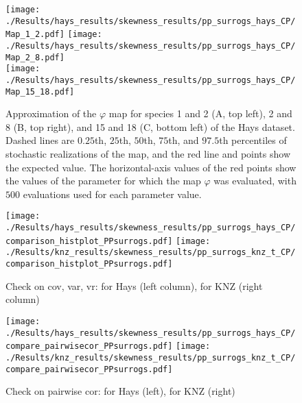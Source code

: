 \documentclass[letterpaper,11pt]{article}
\begin{document}





\begin{figure}
\texttt{[image: ./Results/hays\_results/skewness\_results/pp\_surrogs\_hays\_CP/Map\_1\_2.pdf]} 
\texttt{[image: ./Results/hays\_results/skewness\_results/pp\_surrogs\_hays\_CP/Map\_2\_8.pdf]} \\
\texttt{[image: ./Results/hays\_results/skewness\_results/pp\_surrogs\_hays\_CP/Map\_15\_18.pdf]}
\caption{Approximation of the $\varphi$ map for species 1 and 2 (A, top left), 2 and 8 (B, top right), and 15 and 18 (C, bottom left) 
of the Hays dataset. Dashed lines are $0.25$th, $25$th, $50$th, $75$th, and $97.5$th percentiles 
of stochastic realizations of the map, and
the red line and points show the expected value. The horizontal-axis values of the red 
points show the values of the
parameter for which the map $\varphi$ was evaluated, with $500$ evaluations used for
each parameter value.}\label{fig:varphiexample}
\end{figure}


\begin{figure}
\texttt{[image: ./Results/hays\_results/skewness\_results/pp\_surrogs\_hays\_CP/comparison\_histplot\_PPsurrogs.pdf]}
\texttt{[image: ./Results/knz\_results/skewness\_results/pp\_surrogs\_knz\_t\_CP/comparison\_histplot\_PPsurrogs.pdf]}  
\caption{Check on cov, var, vr: for Hays (left column), for KNZ (right column)}\label{fig:check_cov_var_vr}
\end{figure}

\begin{figure}
\texttt{[image: ./Results/hays\_results/skewness\_results/pp\_surrogs\_hays\_CP/compare\_pairwisecor\_PPsurrogs.pdf]}  
\texttt{[image: ./Results/knz\_results/skewness\_results/pp\_surrogs\_knz\_t\_CP/compare\_pairwisecor\_PPsurrogs.pdf]} 
\caption{Check on pairwise cor: for Hays (left), for KNZ (right)}\label{fig:check_pairwisecor}
\end{figure}
\end{document}
